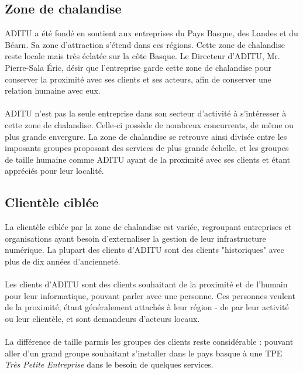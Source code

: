 

\subsection{Zone de chalandise}

ADITU a été fondé en soutient aux entreprises du Pays Basque, des Landes et du Béarn. Sa zone d'attraction s'étend dans ces régions. Cette zone de chalandise reste locale mais très éclatée sur la côte Basque. Le Directeur d'ADITU, Mr. Pierre-Sala Éric, désir que l'entreprise garde cette zone de chalandise pour conserver la proximité avec ses clients et ses acteurs, afin de conserver une relation humaine avec eux.
\\ \\
ADITU n'est pas la seule entreprise dans son secteur d'activité à s'intéresser à cette zone de chalandise. Celle-ci possède de nombreux concurrents, de même ou plus grande envergure. La zone de chalandise se retrouve ainsi divisée entre les imposants groupes proposant des services de plus grande échelle, et les groupes de taille humaine comme ADITU ayant de la proximité avec ses clients et étant appréciés pour leur localité.


\subsection{Clientèle ciblée}

La clientèle ciblée par la zone de chalandise est variée, regroupant entreprises et organisations ayant besoin d'externaliser la gestion de leur infrastructure numérique. La plupart des clients d'ADITU sont des clients "historiques" avec plus de dix années d'ancienneté.
\\ \\
Les clients d'ADITU sont des clients souhaitant de la proximité et de l'humain pour leur informatique, pouvant parler avec une personne. Ces personnes veulent de la proximité, étant généralement attachés à leur région - de par leur activité ou leur clientèle, et sont demandeurs d'acteurs locaux.
\\ \\
La différence de taille parmis les groupes des clients reste considérable : pouvant aller d'un grand groupe souhaitant s'installer dans le pays basque à une TPE \textit{Très Petite Entreprise} dans le besoin de quelques services.

